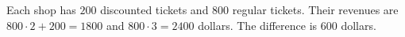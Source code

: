 Each shop has $200$ discounted tickets and $800$ regular tickets. Their revenues are $800\cdot2+200=1800$ and $800\cdot3=2400$ dollars. The difference is $\boxed{600}$ dollars.
